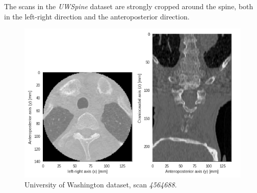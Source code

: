 The scans in the \textit{UWSpine} dataset are strongly cropped around the spine, both in the left-right direction and the anteroposterior direction.

\begin{figure}
    \centering
    \includegraphics[width=.95\textwidth]{automated_graphs/UW_4564688.png}
    \caption{University of Washington dataset, scan \textit{4564688}. \label{fig:UW_4564688}}
\end{figure}